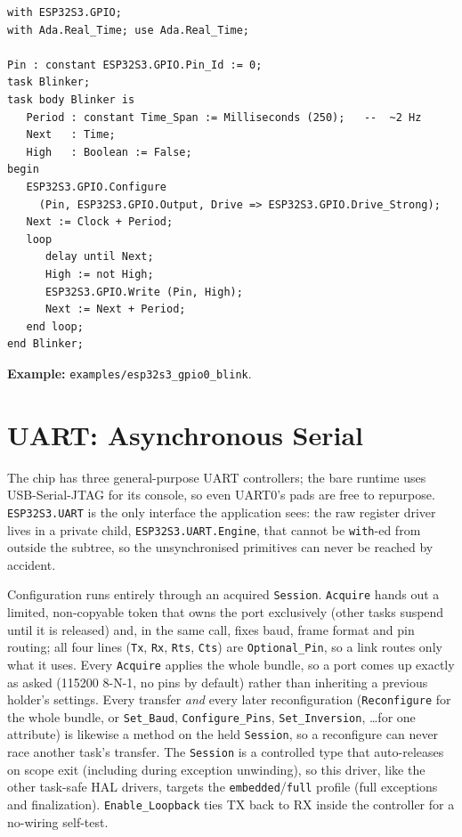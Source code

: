 \begin{lstlisting}
with ESP32S3.GPIO;
with Ada.Real_Time; use Ada.Real_Time;

Pin : constant ESP32S3.GPIO.Pin_Id := 0;
task Blinker;
task body Blinker is
   Period : constant Time_Span := Milliseconds (250);   --  ~2 Hz
   Next   : Time;
   High   : Boolean := False;
begin
   ESP32S3.GPIO.Configure
     (Pin, ESP32S3.GPIO.Output, Drive => ESP32S3.GPIO.Drive_Strong);
   Next := Clock + Period;
   loop
      delay until Next;
      High := not High;
      ESP32S3.GPIO.Write (Pin, High);
      Next := Next + Period;
   end loop;
end Blinker;
\end{lstlisting}


\noindent\textbf{Example:} \texttt{examples/esp32s3\_gpio0\_blink}.

\section{UART: Asynchronous Serial}
\label{app:int:uart}

The chip has three general-purpose UART controllers; the bare runtime uses
USB-Serial-JTAG for its console, so even UART0's pads are free to repurpose.
\texttt{ESP32S3.UART} is the only interface the application sees: the raw
register driver lives in a private child, \texttt{ESP32S3.UART.Engine}, that
cannot be \texttt{with}-ed from outside the subtree, so the unsynchronised
primitives can never be reached by accident.

Configuration runs entirely through an acquired \texttt{Session}.
\texttt{Acquire} hands out a limited, non-copyable token that owns the port
exclusively (other tasks suspend until it is released) and, in the same call,
fixes baud, frame format and pin routing; all four lines (\texttt{Tx},
\texttt{Rx}, \texttt{Rts}, \texttt{Cts}) are \texttt{Optional\_Pin}, so a link
routes only what it uses. Every \texttt{Acquire} applies the whole bundle, so a
port comes up exactly as asked (115200 8-N-1, no pins by default) rather than
inheriting a previous holder's settings. Every transfer \emph{and} every later
reconfiguration (\texttt{Reconfigure} for the whole bundle, or
\texttt{Set\_Baud}, \texttt{Configure\_Pins}, \texttt{Set\_Inversion}, \ldots for
one attribute) is likewise a method on the held \texttt{Session}, so a reconfigure
can never race another task's transfer. The \texttt{Session} is a
controlled type that auto-releases on scope exit (including during exception
unwinding), so this driver, like the other task-safe HAL drivers, targets the
\texttt{embedded}/\texttt{full} profile (full exceptions and finalization).
\texttt{Enable\_Loopback} ties TX back to RX inside the controller for a
no-wiring self-test.

